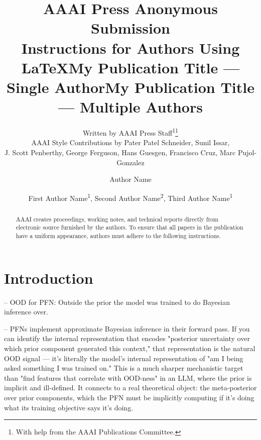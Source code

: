 \documentclass[letterpaper]{article} %
\title{AAAI Press Anonymous Submission\\Instructions for Authors Using \LaTeX{}}
\author{
    Written by AAAI Press Staff\textsuperscript{\rm 1}\thanks{With help from the AAAI Publications Committee.}\\
    AAAI Style Contributions by Pater Patel Schneider,
    Sunil Issar,\\
    J. Scott Penberthy,
    George Ferguson,
    Hans Guesgen,
    Francisco Cruz\equalcontrib,
    Marc Pujol-Gonzalez\equalcontrib
}
\title{My Publication Title --- Single Author}
\author {
    Author Name
}
\title{My Publication Title --- Multiple Authors}
\author {
    First Author Name\textsuperscript{\rm 1},
    Second Author Name\textsuperscript{\rm 2},
    Third Author Name\textsuperscript{\rm 1}
}
\begin{document}
\maketitle

\begin{abstract}
AAAI creates proceedings, working notes, and technical reports directly from electronic source furnished by the authors. To ensure that all papers in the publication have a uniform appearance, authors must adhere to the following instructions.
\end{abstract}


\section{Introduction}


-- OOD for PFN: Outside the prior the model was trained to do Bayesian inference over.


-- PFNs implement approximate Bayesian inference in their forward pass. If you can identify the internal representation that encodes "posterior uncertainty over which prior component generated this context," that representation is the natural OOD signal — it's literally the model's internal representation of "am I being asked something I was trained on." This is a much sharper mechanistic target than "find features that correlate with OOD-ness" in an LLM, where the prior is implicit and ill-defined. It connects to a real theoretical object: the meta-posterior over prior components, which the PFN must be implicitly computing if it's doing what its training objective says it's doing.




% 
\end{document}
